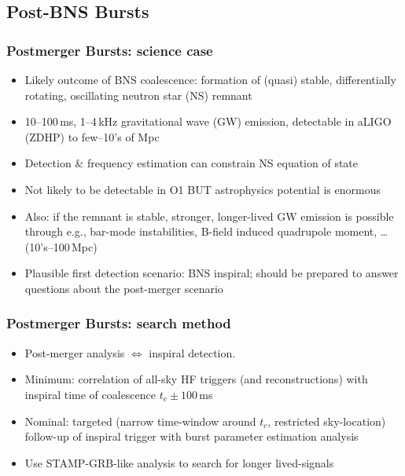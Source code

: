 \documentclass{beamer}
\def\gw#1{gravitational wave#1 (GW#1)\gdef\gw{GW}}
\def\ns#1{neutron star#1 (NS#1)\gdef\ns{NS}}
\begin{document}
\subsection{Post-BNS Bursts}

\begin{frame}
    \frametitle{Postmerger Bursts: science case}
    \begin{itemize}
        \item Likely outcome of BNS coalescence: formation of (quasi) stable,
            differentially rotating, oscillating \ns{} remnant
        \item 10--100\,ms, 1--4\,kHz \gw{} emission, detectable in aLIGO (ZDHP) to
            few--10's of Mpc 
        \item Detection \& frequency estimation can constrain \ns{} equation of
            state
        \item Not likely to be detectable in O1  BUT astrophysics potential is
            enormous
        \item Also: if the remnant is stable, stronger, longer-lived \gw{}
            emission is possible through e.g., bar-mode instabilities, B-field
            induced quadrupole moment, \dots (10's--100\,Mpc)
        \item Plausible first detection scenario: BNS inspiral; should be
            prepared to answer questions about the post-merger scenario
    \end{itemize}
\end{frame}

\begin{frame}
    \frametitle{Postmerger Bursts: search method}
    \begin{itemize}
        \item Post-merger analysis $\iff$ inspiral detection.
        \item Minimum: correlation of all-sky HF triggers (and reconstructions)
            with inspiral time of coalescence $t_c \pm 100$\,ms
        \item Nominal: targeted (narrow time-window around $t_c$, restricted
            sky-location) follow-up of inspiral trigger with burst
            parameter estimation analysis
        \item Use STAMP-GRB-like analysis to search for longer lived-signals
    \end{itemize}
\end{frame}
\end{document}
